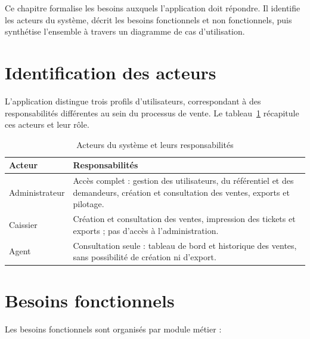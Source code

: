 Ce chapitre formalise les besoins auxquels l'application doit répondre. Il identifie les acteurs du système, décrit les besoins fonctionnels et non fonctionnels, puis synthétise l'ensemble à travers un diagramme de cas d'utilisation.

\section{Identification des acteurs}

L'application distingue trois profils d'utilisateurs, correspondant à des responsabilités différentes au sein du processus de vente. Le tableau~\ref{tab:acteurs} récapitule ces acteurs et leur rôle.

\begin{table}[H]
\centering
\caption{Acteurs du système et leurs responsabilités}
\label{tab:acteurs}
\begin{tabular}{@{}p{3cm}p{11cm}@{}}
\toprule
\textbf{Acteur} & \textbf{Responsabilités} \\
\midrule
Administrateur & Accès complet : gestion des utilisateurs, du référentiel et des demandeurs, création et consultation des ventes, exports et pilotage. \\
Caissier & Création et consultation des ventes, impression des tickets et exports ; pas d'accès à l'administration. \\
Agent & Consultation seule : tableau de bord et historique des ventes, sans possibilité de création ni d'export. \\
\bottomrule
\end{tabular}
\end{table}

\section{Besoins fonctionnels}

Les besoins fonctionnels sont organisés par module métier :

